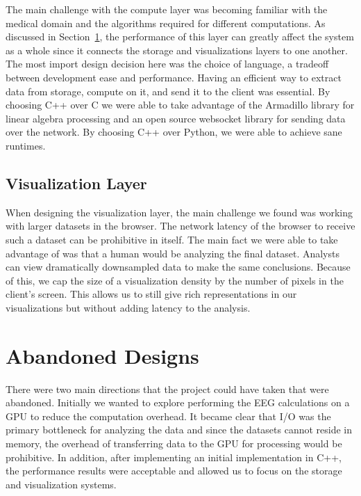 The main challenge with the compute layer was becoming familiar with the
medical domain and the algorithms required for different computations. As
discussed in Section~\ref{discuss-ch:abandon}, the performance of this layer
can greatly affect the system as a whole since it connects the storage and
visualizations layers to one another. The most import design decision here was
the choice of language, a tradeoff between development ease and performance.
Having an efficient way to extract data from storage, compute on it, and send
it to the client was essential. By choosing C++ over C we were able to take
advantage of the Armadillo \cite{arma} library for linear algebra processing
and an open source websocket library \cite{websocket-server} for sending data
over the network. By choosing C++ over Python, we were able to achieve
sane runtimes.

\subsection{Visualization Layer}

When designing the visualization layer, the main challenge we found was working
with larger datasets in the browser. The network latency of the browser to
receive such a dataset can be prohibitive in itself. The main fact we were able
to take advantage of was that a human would be analyzing the final dataset.
Analysts can view dramatically downsampled data to make the same conclusions.
Because of this, we cap the size of a visualization density by the number of
pixels in the client's screen. This allows us to still give rich
representations in our visualizations but without adding latency to the
analysis.

\section{Abandoned Designs}\label{discuss-ch:abandon}

There were two main directions that the project could have taken that were
abandoned. Initially we wanted to explore performing the EEG calculations on a
GPU to reduce the computation overhead. It became clear that I/O was the
primary bottleneck for analyzing the data and since the datasets cannot reside
in memory, the overhead of transferring data to the GPU for processing would be
prohibitive. In addition, after implementing an initial implementation in C++,
the performance results were acceptable and allowed us to focus on the storage
and visualization systems. \\

